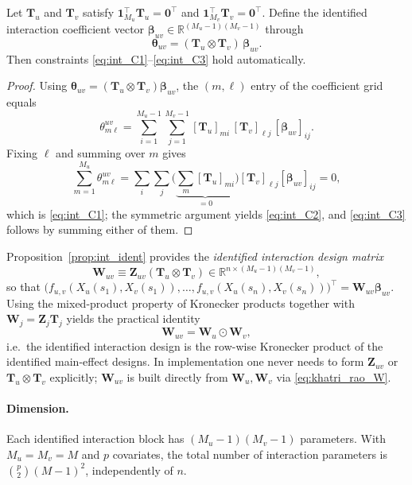 \begin{proposition}\label{prop:int_ident}
Let $\mathbf T_u$ and $\mathbf T_v$ satisfy $\mathbf 1_{M_u}^\top\mathbf T_u=\mathbf 0^\top$
and $\mathbf 1_{M_v}^\top\mathbf T_v=\mathbf 0^\top$. Define the identified interaction
coefficient vector $\boldsymbol\beta_{uv}\in\mathbb{R}^{(M_u-1)(M_v-1)}$ through
\[
\boldsymbol\theta_{uv}=(\mathbf T_u\otimes\mathbf T_v)\,\boldsymbol\beta_{uv}.
\]
Then constraints \eqref{eq:int_C1}--\eqref{eq:int_C3} hold automatically.
\end{proposition}

\begin{proof}
Using $\boldsymbol\theta_{uv}=(\mathbf T_u\otimes\mathbf T_v)\boldsymbol\beta_{uv}$, the
$(m,\ell)$ entry of the coefficient grid equals
\[
\theta^{uv}_{m\ell}
=\sum_{i=1}^{M_u-1}\sum_{j=1}^{M_v-1}[\mathbf T_u]_{mi}\,[\mathbf T_v]_{\ell j}\,
[\boldsymbol\beta_{uv}]_{ij}.
\]
Fixing $\ell$ and summing over $m$ gives
\[
\sum_{m=1}^{M_u}\theta^{uv}_{m\ell}
=\sum_{i}\sum_{j}\Big(\underbrace{\textstyle\sum_{m}[\mathbf T_u]_{mi}}_{=0}\Big)[\mathbf T_v]_{\ell j}[\boldsymbol\beta_{uv}]_{ij}=0,
\]
which is \eqref{eq:int_C1}; the symmetric argument yields \eqref{eq:int_C2}, and
\eqref{eq:int_C3} follows by summing either of them.
\end{proof}

Proposition~\ref{prop:int_ident} provides the \emph{identified interaction design matrix}
\[
\mathbf W_{uv}\equiv \mathbf Z_{uv}(\mathbf T_u\otimes\mathbf T_v)\in\mathbb{R}^{n\times(M_u-1)(M_v-1)},
\]
so that $\big(f_{u,v}(X_u(s_1),X_v(s_1)),\ldots,f_{u,v}(X_u(s_n),X_v(s_n))\big)^\top
=\mathbf W_{uv}\boldsymbol\beta_{uv}$. Using the mixed-product property of Kronecker products
together with $\mathbf W_j=\mathbf Z_j\mathbf T_j$ yields the practical identity
\begin{equation}
\mathbf W_{uv}=\mathbf W_u\odot\mathbf W_v,
\label{eq:khatri_rao_W}
\end{equation}
i.e.\ the identified interaction design is the row-wise Kronecker product of the identified
main-effect designs. In implementation one never needs to form $\mathbf Z_{uv}$ or
$\mathbf T_u\otimes\mathbf T_v$ explicitly; $\mathbf W_{uv}$ is built directly from
$\mathbf W_u,\mathbf W_v$ via \eqref{eq:khatri_rao_W}.

\paragraph{Dimension.} Each identified interaction block has
$(M_u-1)(M_v-1)$ parameters. With $M_u=M_v=M$ and $p$ covariates, the total number of
interaction parameters is $\binom{p}{2}(M-1)^2$, independently of $n$.

